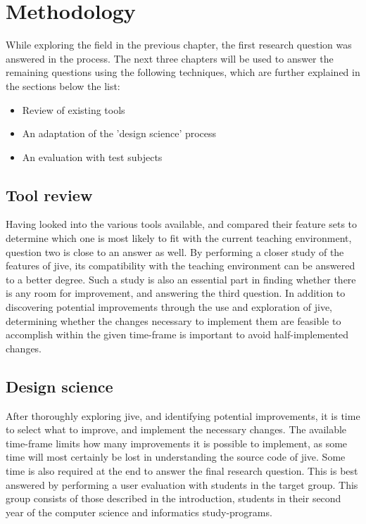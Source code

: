 \chapter{Methodology}\label{methodology}

While exploring the field in the previous chapter, the first research question was answered in the process.
The next three chapters will be used to answer the remaining questions using the following techniques, which are further explained in the sections below the list:

\begin{itemize}
	\item{Review of existing tools}
	\item{An adaptation of the 'design science' process}%
	\item{An evaluation with test subjects}
\end{itemize}

\section{Tool review}\label{methReview}

Having looked into the various tools available, and compared their feature sets to determine which one is most likely to fit with the current teaching environment, question two is close to an answer as well.
By performing a closer study of the features of \gls{jive}, its compatibility with the teaching environment can be answered to a better degree.
Such a study is also an essential part in finding whether there is any room for improvement, and answering the third question.
In addition to discovering potential improvements through the use and exploration of \gls{jive}, determining whether the changes necessary to implement them are feasible to accomplish within the given time-frame is important to avoid half-implemented changes.


\section{Design science}\label{methDesign}

After thoroughly exploring \gls{jive}, and identifying potential improvements, it is time to select what to improve, and implement the necessary changes.
The available time-frame limits how many improvements it is possible to implement, as some time will most certainly be lost in understanding the source code of \gls{jive}.
Some time is also required at the end to answer the final research question.
This is best answered by performing a user evaluation with students in the target group.
This group consists of those described in the introduction, students in their second year of the computer science and informatics study-programs.


